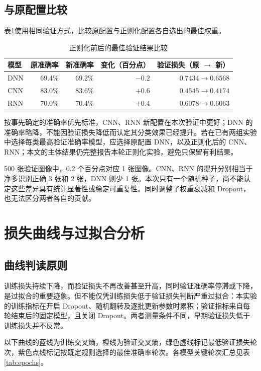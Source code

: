 \documentclass[UTF8,a4paper,zihao=-4,fontset=fandol]{ctexart}
\begin{document}
\subsection{与原配置比较}
表\ref{tab:comparison}使用相同验证方式，比较原配置与正则化配置各自选出的最佳权重。
\begin{table}[htbp]
\centering\small
\caption{正则化前后的最佳验证结果比较}\label{tab:comparison}
\begin{tabular}{lrrrr}
\toprule
模型 & 原准确率 & 新准确率 & 变化（百分点） & 验证损失（原 $\rightarrow$ 新）\\
\midrule
DNN & 69.4\% & 69.2\% & $-0.2$ & $0.7434\rightarrow0.6568$\\
CNN & 83.0\% & 83.6\% & $+0.6$ & $0.4545\rightarrow0.4174$\\
RNN & 70.0\% & 70.4\% & $+0.4$ & $0.6078\rightarrow0.6063$\\
\bottomrule
\end{tabular}
\end{table}

按事先确定的准确率优先标准，CNN、RNN 新配置在本次验证中更好；DNN 的准确率略降，不能因验证损失降低而认定其分类效果已经提升。若在已有两组实验中选择每类最高验证准确率模型，应选择原配置 DNN，以及正则化后的 CNN、RNN；本文的主体结果仍完整报告本轮正则化实验，避免只保留有利结果。

500 张验证图像中，0.2 个百分点对应 1 张图像。CNN、RNN 的提升分别相当于净多识别正确 3 张和 2 张，DNN 则少 1 张。本次只有一个随机种子，尚不能认定这些差异具有统计显著性或稳定可重复性。同时调整了权重衰减和 Dropout，也无法区分两者各自的贡献。
\FloatBarrier

\section{损失曲线与过拟合分析}
\subsection{曲线判读原则}
训练损失持续下降，而验证损失不再改善甚至升高，同时验证准确率停滞或下降，是过拟合的重要迹象。但不能仅凭训练损失低于验证损失判断严重过拟合：本实验的训练指标在开启 Dropout、随机翻转及逐批更新参数时累积；验证指标来自每轮结束后的固定模型，且关闭 Dropout。两者测量条件不同，早期验证损失低于训练损失并不反常。

以下曲线的蓝线为训练交叉熵，橙线为验证交叉熵，绿色虚线标记最低验证损失轮次，紫色点线标记按既定规则选择的最佳准确率轮次。各模型关键轮次汇总见表\ref{tab:epochs}。
\end{document}

